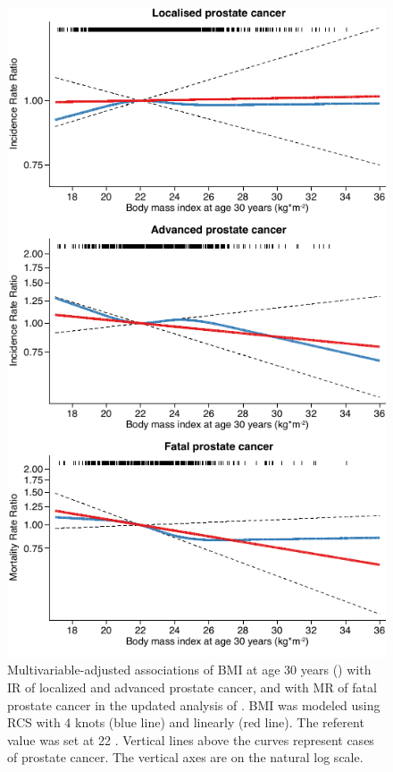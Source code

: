 \begin{figure}[p]
\centering
\includegraphics[width=.8\linewidth]{figures/paper1_30.pdf}
\caption[Associations of BMI at age 30 years with localized, advanced, and fatal prostate cancer]{Multivariable-adjusted associations of BMI at age 30 years (\kgmsq) with IR of localized and advanced prostate cancer, and with MR of fatal prostate cancer in the updated analysis of . BMI was modeled using RCS with 4 knots (blue line) and linearly (red line).  The referent value was set at 22 \kgmsq. Vertical lines above the curves represent cases of prostate cancer. The vertical axes are on the natural log scale.}
\label{fig:paper1_30}
\end{figure}

